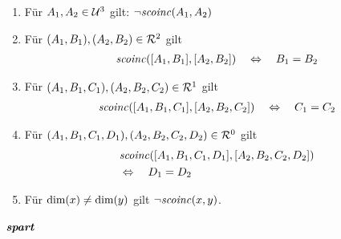     \begin{enumerate}
        \item Für $A_1, A_2 \in \mathcal{U}^3$ gilt: $\neg \mathit{scoinc}(A_1,A_2)$
        \item Für $(A_1,B_1), (A_2,B_2) \in \mathcal{R}^2$ gilt 
            \begin{align*}
                \mathit{scoinc}([A_1,B_1],[A_2,B_2]) \quad \Leftrightarrow  \quad B_1 = B_2
            \end{align*}
        \item Für $(A_1,B_1,C_1), (A_2,B_2,C_2) \in \mathcal{R}^1$ gilt 
            \begin{align*}
                \mathit{scoinc}([A_1,B_1,C_1],[A_2,B_2,C_2]) \quad \Leftrightarrow  \quad C_1 = C_2
            \end{align*}
        \item Für $(A_1,B_1,C_1,D_1), (A_2,B_2,C_2,D_2) \in \mathcal{R}^0$ gilt 
            \begin{align*}
                &\mathit{scoinc}([A_1,B_1,C_1,D_1],[A_2,B_2,C_2,D_2]) \\
                &\Leftrightarrow  \quad D_1 = D_2
            \end{align*}
        \item Für $\text{dim}(x) \neq \text{dim}(y)$ gilt $\neg \mathit{scoinc}(x,y)$.
    \end{enumerate}
    
    
\paragraph{$\boldsymbol{\mathit{spart}}$}

